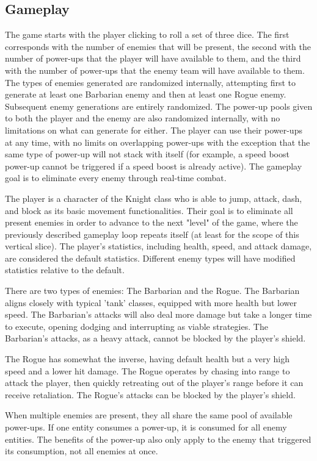 \documentclass[10pt,twocolumn]{article}
\begin{document}
\subsection{Gameplay}
The game starts with the player clicking to roll a set of three dice. The first corresponds with the number of enemies that will be present, the second with the number of power-ups that the player will have available to them, and the third with the number of power-ups that the enemy team will have available to them. The types of enemies generated are randomized internally, attempting first to generate at least one Barbarian enemy and then at least one Rogue enemy. Subsequent enemy generations are entirely randomized. The power-up pools given to both the player and the enemy are also randomized internally, with no limitations on what can generate for either. The player can use their power-ups at any time, with no limits on overlapping power-ups with the exception that the same type of power-up will not stack with itself (for example, a speed boost power-up cannot be triggered if a speed boost is already active). The gameplay goal is to eliminate every enemy through real-time combat. 

The player is a character of the Knight class who is able to jump, attack, dash, and block as its basic movement functionalities. Their goal is to eliminate all present enemies in order to advance to the next "level" of the game, where the previously described gameplay loop repeats itself (at least for the scope of this vertical slice). The player's statistics, including health, speed, and attack damage, are considered the default statistics. Different enemy types will have modified statistics relative to the default.

There are two types of enemies: The Barbarian and the Rogue. 
The Barbarian aligns closely with typical 'tank' classes, equipped with more health but lower speed. The Barbarian's attacks will also deal more damage but take a longer time to execute, opening dodging and interrupting as viable strategies. The Barbarian's attacks, as a heavy attack, cannot be blocked by the player's shield. 

The Rogue has somewhat the inverse, having default health but a very high speed and a lower hit damage. The Rogue operates by chasing into range to attack the player, then quickly retreating out of the player's range before it can receive retaliation. The Rogue's attacks can be blocked by the player's shield.

When multiple enemies are present, they all share the same pool of available power-ups. If one entity consumes a power-up, it is consumed for all enemy entities. The benefits of the power-up also only apply to the enemy that triggered its consumption, not all enemies at once. 
\end{document}
